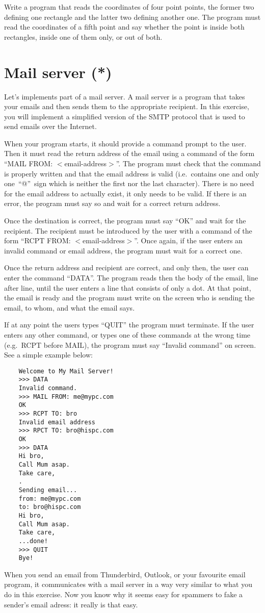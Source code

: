 \documentclass{article}
\begin{document}
Write a program that reads the coordinates of four point points, the
former two defining one rectangle and the latter two defining
another one. The program must read the coordinates of a fifth point and
say whether the point is inside both rectangles, inside one of them
only, or out of both. 


\section{Mail server (*)}
\label{sec:mail-server}

Let's implements part of a mail server. A mail server is a program
that takes your emails and then sends them to the appropriate
recipient. In this exercise, you will implement a simplified version
of the SMTP protocol that is used to send emails over the Internet. 

When your program starts, it should provide a command prompt to the
user. Then it must read the return address of the email using a
command of the form ``MAIL FROM: $<$email-address$>$''. The program
must check that the command is properly written and that the email
address is valid (i.e.~contains one and only one~``@''~sign 
which is neither the
first nor the last character). There is no need for the email address
to actually exist, it only needs to be valid. If there is an error,
the program must 
say so and wait for a correct return address.

Once the destination is correct, the program must say ``OK'' and wait
for the recipient. The recipient must be introduced by the user with a
command of the form ``RCPT FROM: $<$email-address$>$''. Once again, if
the user enters an invalid command or email address, the program must
wait for a correct one. 

Once the return address and recipient are correct, and only then, the
user can enter the command ``DATA''. The program reads then the body
of the email, line after line, until the user enters a line that
consists of only a dot. At that point, the email is ready and the
program must write on the screen who is sending the email, to whom,
and what the email says. 

If at any point the users types ``QUIT'' the program must
terminate. If the user enters any other command, or types one of these
commands at the wrong time (e.g.~RCPT before MAIL), the program must
say ``Invalid command'' on screen. See a simple example below: 

\begin{verbatim}
    Welcome to My Mail Server!
    >>> DATA
    Invalid command. 
    >>> MAIL FROM: me@mypc.com
    OK
    >>> RCPT TO: bro
    Invalid email address
    >>> RPCT TO: bro@hispc.com
    OK
    >>> DATA
    Hi bro, 
    Call Mum asap.
    Take care,
    .
    Sending email...
    from: me@mypc.com
    to: bro@hispc.com
    Hi bro, 
    Call Mum asap.
    Take care,
    ...done!
    >>> QUIT
    Bye!    
\end{verbatim}

When you send an email from Thunderbird, Outlook, or your favourite
email program, it communicates with a mail server in a way very
similar to what you do in this exercise. Now you know why it seems
easy for spammers to fake a sender's email adress: it
really is that easy.
\end{document}
